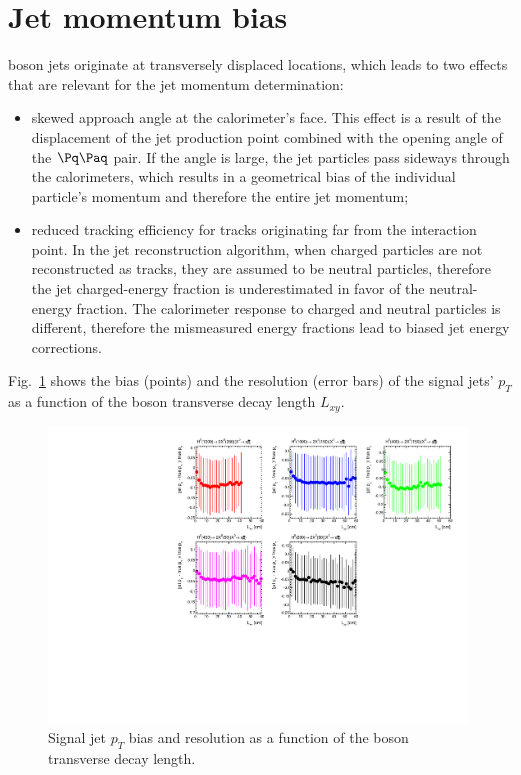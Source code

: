 \section{Jet momentum bias}
\label{sec:ptbias}

\X boson jets originate at transversely displaced locations, which leads to two effects 
that are relevant for the jet 
momentum determination:
\begin{itemize}
 \item skewed approach angle at the calorimeter's face. This effect is a result of the displacement 
of the jet production point combined with the opening angle of the $\qq$ pair.
If the angle is large, the jet particles pass sideways through the calorimeters, 
 which results in a geometrical bias of the individual
particle's momentum and therefore the entire jet momentum;  
 \item reduced tracking efficiency for tracks originating far from the interaction point. 
In the jet reconstruction algorithm, when charged particles
are not reconstructed as tracks, they are assumed to be neutral particles, therefore the jet 
charged-energy fraction is underestimated in favor of the neutral-energy fraction. 
The calorimeter response to charged and neutral particles is different,
therefore the mismeasured energy fractions lead to biased jet energy corrections.
\end{itemize}
Fig.~\ref{fig:jetbias} shows the bias (points) and the resolution (error bars) of the signal jets' $p_T$ as a function of the \X boson transverse decay length $L_{xy}$.

\begin{figure}[htbp]
\centering
\includegraphics[width=0.99\textwidth]{plots/signal/biaslxy.pdf}
\caption{Signal jet $p_T$ bias and resolution as a function of the \X boson transverse decay length.\label{fig:jetbias}}
\end{figure} 
   

